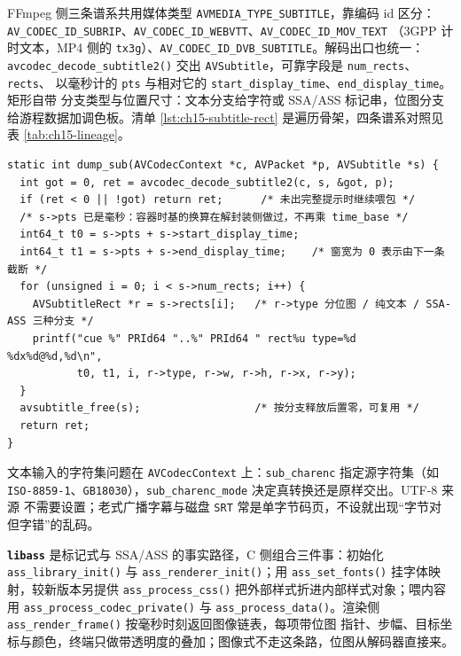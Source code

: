 \documentclass[12pt,a4paper,fontset=fandol]{ctexbook}
\newcommand{\Fn}[1]{\texttt{#1()}}
\newcommand{\Tp}[1]{\texttt{#1}}
\newcommand{\Bk}{\discretionary{}{}{}}
\newcommand{\Lib}[1]{\textbf{\texttt{#1}}}
\begin{document}
FFmpeg 侧三条谱系共用媒体类型 \Tp{AVMEDIA\_{\Bk}TYPE\_{\Bk}SUBTITLE}，靠编码 id 区分：
\Tp{AV\_{\Bk}CODEC\_{\Bk}ID\_{\Bk}SUBRIP}、\Tp{AV\_{\Bk}CODEC\_{\Bk}ID\_{\Bk}WEBVTT}、\Tp{AV\_{\Bk}CODEC\_{\Bk}ID\_{\Bk}MOV\_{\Bk}TEXT}
（3GPP 计时文本，MP4 侧的 \Tp{tx3g}）、\Tp{AV\_{\Bk}CODEC\_{\Bk}ID\_{\Bk}DVB\_{\Bk}SUBTITLE}。解码出口也统一：
\Fn{avcodec\_{\Bk}decode\_{\Bk}subtitle2} 交出 \Tp{AVSubtitle}，可靠字段是 \Tp{num\_rects}、\Tp{rects}、
以毫秒计的 \Tp{pts} 与相对它的 \Tp{start\_{\Bk}display\_{\Bk}time}、\Tp{end\_{\Bk}display\_{\Bk}time}。矩形自带
分支类型与位置尺寸：文本分支给字符或 SSA/ASS 标记串，位图分支给游程数据加调色板。清单
\ref{lst:ch15-subtitle-rect} 是遍历骨架，四条谱系对照见表 \ref{tab:ch15-lineage}。

\begin{lstlisting}[style=cstyle,caption={遍历 \Tp{AVSubtitle}：一条提示的时间窗与三种呈现分支},label={lst:ch15-subtitle-rect}]
static int dump_sub(AVCodecContext *c, AVPacket *p, AVSubtitle *s) {
  int got = 0, ret = avcodec_decode_subtitle2(c, s, &got, p);
  if (ret < 0 || !got) return ret;      /* 未出完整提示时继续喂包 */
  /* s->pts 已是毫秒：容器时基的换算在解封装侧做过，不再乘 time_base */
  int64_t t0 = s->pts + s->start_display_time;
  int64_t t1 = s->pts + s->end_display_time;    /* 窗宽为 0 表示由下一条截断 */
  for (unsigned i = 0; i < s->num_rects; i++) {
    AVSubtitleRect *r = s->rects[i];   /* r->type 分位图 / 纯文本 / SSA-ASS 三种分支 */
    printf("cue %" PRId64 "..%" PRId64 " rect%u type=%d %dx%d@%d,%d\n",
           t0, t1, i, r->type, r->w, r->h, r->x, r->y);
  }
  avsubtitle_free(s);                  /* 按分支释放后置零，可复用 */
  return ret;
}
\end{lstlisting}

文本输入的字符集问题在 \Tp{AVCodecContext} 上：\Tp{sub\_charenc} 指定源字符集（如
\Tp{ISO-8859-1}、\Tp{GB18030}），\Tp{sub\_charenc\_mode} 决定真转换还是原样交出。UTF-8 来源
不需要设置；老式广播字幕与磁盘 \Tp{SRT} 常是单字节码页，不设就出现``字节对但字错''的乱码。

\Lib{libass} 是标记式与 SSA/ASS 的事实路径，C 侧组合三件事：初始化 \Fn{ass\_{\Bk}library\_{\Bk}init}
与 \Fn{ass\_{\Bk}renderer\_{\Bk}init}；用 \Fn{ass\_{\Bk}set\_{\Bk}fonts} 挂字体映射，较新版本另提供
\Fn{ass\_{\Bk}process\_{\Bk}css} 把外部样式折进内部样式对象；喂内容用 \Fn{ass\_{\Bk}process\_{\Bk}codec\_{\Bk}private}
与 \Fn{ass\_{\Bk}process\_{\Bk}data}。渲染侧 \Fn{ass\_{\Bk}render\_{\Bk}frame} 按毫秒时刻返回图像链表，每项带位图
指针、步幅、目标坐标与颜色，终端只做带透明度的叠加；图像式不走这条路，位图从解码器直接来。
\end{document}
